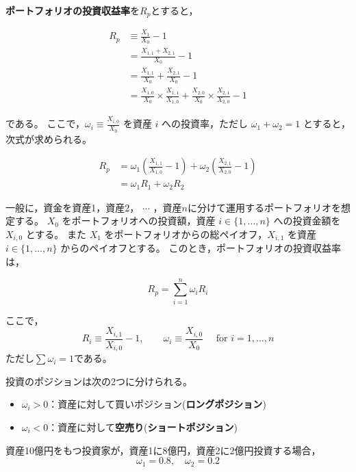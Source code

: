 \documentclass[
  letterpaper,
  pandoc,
  ja=standard,
  jafont = hiragino-pron]{ltjsbook}
\providecommand{\tightlist}{%
  \setlength{\itemsep}{0pt}\setlength{\parskip}{0pt}}\usepackage{longtable,booktabs,array}
\begin{document}
\textbf{ポートフォリオの投資収益率}を\(R_p\)とすると，

\[
\begin{aligned}
R_p &\equiv  \frac{X_1}{X_0} -1 \\
    &= \frac{X_{1,1} + X_{2,1}}{X_0} -1\\
    &= \frac{X_{1,1}}{X_0} + \frac{X_{2,1}}{X_0} -1 \\
    &= \frac{X_{1,0}}{X_0} \times \frac{X_{1,1}}{X_{1,0}} + \frac{X_{2,0}}{X_0} \times \frac{X_{2,1}}{X_{2,0}} -1
\end{aligned}
\]

である。 ここで，\(\omega _i \equiv \frac{X_{i,0}}{X_0}\) を資産 \(i\)
への投資率，ただし \(\omega _1 + \omega_2 =  1\)
とすると，次式が求められる。

\[
\begin{aligned}
R_p &= \omega _1 \left ( \frac{X_{1,1}}{X_{1,0}} -1 \right )  + \omega _2 \left ( \frac{X_{2,1}}{X_{2,0}} -1 \right ) \nonumber \\
&= \omega _1 R_1 + \omega _2 R_2
\end{aligned}
\]

一般に，資金を資産1，資産2， \(\cdots\)
，資産\(n\)に分けて運用するポートフォリオを想定する。 \(X_0\)
をポートフォリオへの投資額，資産 \(i \in \{1,\dots , n \}\)
への投資金額を \(X_{i,0}\) とする。 また \(X_1\)
をポートフォリオからの総ペイオフ，\(X_{i,1}\) を資産
\(i \in \{1,\dots , n \}\) からのペイオフとする。
このとき，ポートフォリオの投資収益率は，

\[
R_p = \sum_{i=1}^{n} \omega _i R_i
\]

ここで， \[
R_i \equiv \frac{X_{i,1}}{X_{i,0}} - 1, \qquad  \omega _i \equiv \frac{X_{i,0}}{X_0} \quad  \text{ for } i=1,\dots,n
\] ただし\(\sum \omega _i = 1\)である。

投資のポジションは次の2つに分けられる。

\begin{itemize}
\tightlist
\item
  \(\omega _i >0\)：資産に対して買いポジション(\textbf{ロングポジション})
\item
  \(\omega _i <0\)：資産に対して\textbf{空売り}(\textbf{ショートポジション})
\end{itemize}

\begin{tcolorbox}[enhanced jigsaw, colframe=quarto-callout-note-color-frame, breakable, rightrule=.15mm, coltitle=black, title=\textcolor{quarto-callout-note-color}{\faInfo}\hspace{0.5em}{例3}, colbacktitle=quarto-callout-note-color!10!white, leftrule=.75mm, colback=white, left=2mm, arc=.35mm, opacityback=0, titlerule=0mm, toptitle=1mm, bottomtitle=1mm, bottomrule=.15mm, toprule=.15mm, opacitybacktitle=0.6]

資産10億円をもつ投資家が，資産1に8億円，資産2に2億円投資する場合， \[
\omega _1 = 0.8, \quad \omega _2 = 0.2
\]

\end{tcolorbox}
\end{document}
